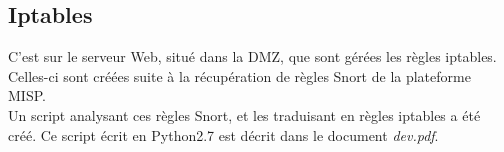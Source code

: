 \subsection{Iptables}

C'est sur le serveur Web, situé dans la DMZ, que sont gérées les règles iptables. Celles-ci sont créées suite à la récupération de règles Snort de la  plateforme MISP. \\

Un script analysant ces règles Snort, et les traduisant en règles iptables a été créé. Ce script écrit en Python2.7 est décrit dans le document \textit{dev.pdf}.